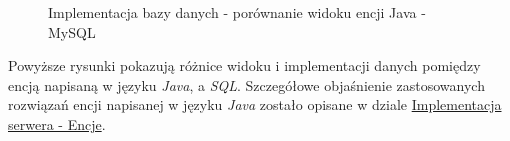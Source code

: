 \documentclass[10pt,titlepage]{article} %
\begin{document}
\begin{figure}[H]%
    \centering
    \qquad
     \caption[Implementacja bazy danych - porównanie widoku encji Java - SQL]{Implementacja bazy danych - porównanie widoku encji Java - MySQL}%
\end{figure}

Powyższe rysunki pokazują różnice widoku i implementacji danych pomiędzy encją napisaną w języku \textit{Java}, a \textit{SQL}. Szczegółowe objaśnienie zastosowanych rozwiązań encji napisanej w języku \textit{Java} zostało opisane w dziale \hyperref[Encje]{Implementacja serwera - Encje}.
\end{document}
